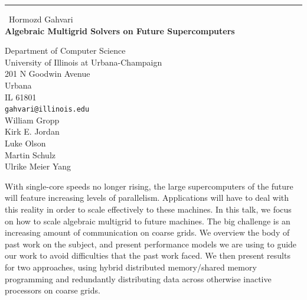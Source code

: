 \documentclass{report}
\begin{document}
\begin{center}
\rule{6in}{1pt} \
{\large Hormozd Gahvari \\
{\bf Algebraic Multigrid Solvers on Future Supercomputers}}

Department of Computer Science \\ University of Illinois at Urbana-Champaign \\ 201 N Goodwin Avenue \\ Urbana \\ IL 61801
\\
{\tt gahvari@illinois.edu}\\
William Gropp\\
Kirk E. Jordan\\
Luke Olson\\
Martin Schulz\\
Ulrike Meier Yang\end{center}

With single-core speeds no longer rising, the large supercomputers of the
future will feature increasing levels of parallelism. Applications will
have to deal with this reality in order to scale effectively to these
machines. In this talk, we focus on how to scale algebraic multigrid to
future machines. The big challenge is an increasing amount of
communication on coarse grids. We overview the body of past work on the
subject, and present performance models we are using to guide our work to
avoid difficulties that the past work faced. We then present results for
two approaches, using hybrid distributed memory/shared memory programming
and redundantly distributing data across otherwise inactive processors on
coarse grids.
\end{document}
